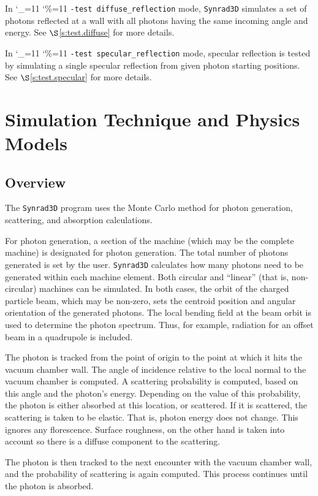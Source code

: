 \documentclass[11pt,openany]{report}
\newcommand{\sref}[1]{$\S$\ref{#1}}
\newcommand{\srthree}{\texttt{Synrad3D}\xspace}
\newcommand\ttcmd{\begingroup\catcode`\_=11 \catcode`\%=11 \dottcmd}
\newcommand\dottcmd[1]{\texttt{#1}\endgroup}
\newcommand{\vn}{\ttcmd}
\begin{document}
In \vn{-test diffuse_reflection} mode, \srthree simulates a set of photons
reflected at a wall with all photons having the same incoming angle
and energy. See \sref{s:test.diffuse} for more details.

In \vn{-test specular_reflection} mode, specular reflection is tested
by simulating a single specular reflection from given photon
starting positions. See \sref{s:test.specular} for more details.

\chapter{Simulation Technique and Physics Models}
\section{Overview} 

The \srthree program uses the Monte Carlo method for photon
generation, scattering, and absorption calculations.

For photon generation, a section of the machine (which may be the
complete machine) is designated for photon generation.  The total
number of photons generated is set by the user. \srthree calculates
how many photons need to be generated within each machine
element. Both circular and ``linear'' (that is, non-circular) machines
can be simulated.  In both cases, the orbit of the charged particle
beam, which may be non-zero, sets the centroid position and angular
orientation of the generated photons. The local bending field at the
beam orbit is used to determine the photon spectrum. Thus, for
example, radiation for an offset beam in a quadrupole is included.

The photon is tracked from the point of origin to
the point at which it hits the vacuum chamber wall. The angle of
incidence relative to the local normal to the vacuum chamber is
computed. A scattering probability is computed, based on this angle
and the photon's energy. Depending on the value of this probability,
the photon is either absorbed at this location, or scattered. If it is
scattered, the scattering is taken to be elastic. That is, photon
energy does not change. This ignores any florescence. Surface
roughness, on the other hand is taken into account so there is a
diffuse component to the scattering.

The photon is then tracked to the next encounter with the vacuum
chamber wall, and the probability of scattering is again
computed. This process continues until the photon is absorbed.
\end{document}
